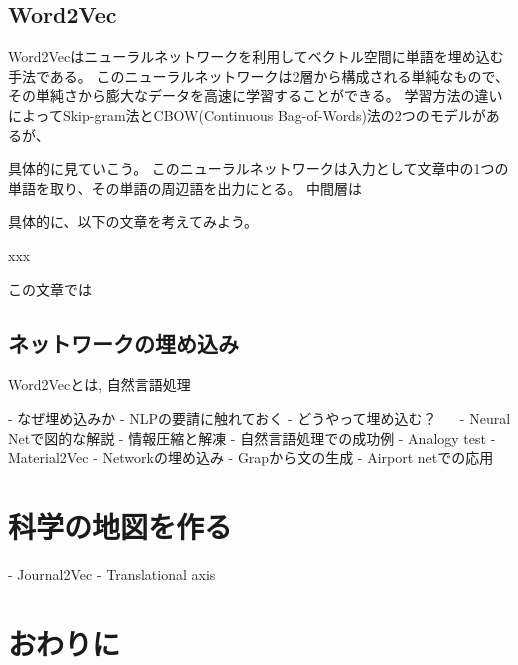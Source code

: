 \documentclass[J]{scitrans}
\begin{document}
\subsection{Word2Vec}

Word2Vecはニューラルネットワークを利用してベクトル空間に単語を埋め込む手法である。
このニューラルネットワークは2層から構成される単純なもので、その単純さから膨大なデータを高速に学習することができる。
学習方法の違いによってSkip-gram法とCBOW(Continuous Bag-of-Words)法の2つのモデルがあるが、

具体的に見ていこう。
このニューラルネットワークは入力として文章中の1つの単語を取り、その単語の周辺語を出力にとる。
中間層は

具体的に、以下の文章を考えてみよう。

xxx

この文章では

\subsection{ネットワークの埋め込み}


Word2Vecとは, 自然言語処理



- なぜ埋め込みか
    - NLPの要請に触れておく
- どうやって埋め込む？
　  - Neural Netで図的な解説
    - 情報圧縮と解凍
- 自然言語処理での成功例
    - Analogy test
    - Material2Vec
- Networkの埋め込み
    - Grapから文の生成
- Airport netでの応用

\section{科学の地図を作る}

- Journal2Vec
- Translational axis




\section{おわりに}


\acknowledgement





\end{document}
